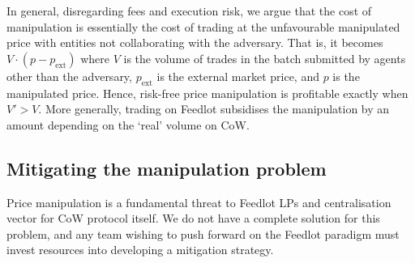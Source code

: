 \documentclass[a4paper,10pt]{article}
\theoremstyle{remark}
\begin{document}
In general, disregarding fees and execution risk, we argue that the cost of manipulation is essentially the cost of trading at the unfavourable manipulated price with entities not collaborating with the adversary. 
%
That is, it becomes $V\cdot(p - p_\mathrm{ext})$ where $V$ is the volume of trades in the batch submitted by agents other than the adversary, $p_\mathrm{ext}$ is the external market price, and $p$ is the manipulated price.
%
Hence, risk-free price manipulation is profitable exactly when $V'>V$.
%
More generally, trading on Feedlot subsidises the manipulation by an amount depending on the `real' volume on CoW.

\subsection{Mitigating the manipulation problem}
\label{manipulation-enforcement}

Price manipulation is a fundamental threat to Feedlot LPs and centralisation vector for CoW protocol itself. 
%
We do not have a complete solution for this problem, and any team wishing to push forward on the Feedlot paradigm must invest resources into developing a mitigation strategy.
\end{document}
